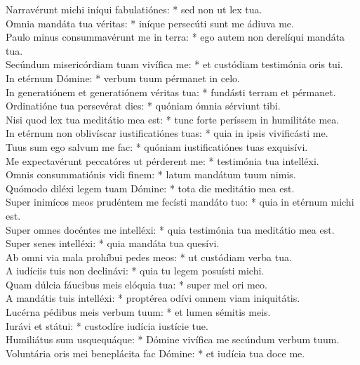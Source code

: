 {	Narravérunt michi iníqui fabulatiónes: * sed non ut lex tua. \\
	Omnia mandáta tua véritas: * iníque persecúti sunt me ádiuva me. \\
	Paulo minus consummavérunt me in terra: * ego autem non derelíqui mandáta tua. \\
	Secúndum misericórdiam tuam vivífica me: * et custódiam testimónia oris tui. \\
	In etérnum Dómine: * verbum tuum pérmanet in celo. \\
	In generatiónem et generatiónem véritas tua: * fundásti terram et pérmanet. \\
	Ordinatióne tua persevérat dies: * quóniam ómnia sérviunt tibi. \\
	Nisi quod lex tua meditátio mea est: * tunc forte períssem in humilitáte mea. \\
	In etérnum non oblivíscar iustificatiónes tuas: * quia in ipsis vivificásti me. \\
	Tuus sum ego salvum me fac: * quóniam iustificatiónes tuas exquisívi. \\
	Me expectavérunt peccatóres ut pérderent me: * testimónia tua intelléxi. \\
	Omnis consummatiónis vidi finem: * latum mandátum tuum nimis. \\
	Quómodo diléxi legem tuam Dómine: * tota die meditátio mea est. \\
	Super inimícos meos prudéntem me fecísti mandáto tuo: * quia in etérnum michi est. \\
	Super omnes docéntes me intelléxi: * quia testimónia tua meditátio mea est. \\
	Super senes intelléxi: * quia mandáta tua quesívi. \\
	Ab omni via mala prohíbui pedes meos: * ut custódiam verba tua. \\
	A iudíciis tuis non declinávi: * quia tu legem posuísti michi. \\
	Quam dúlcia fáucibus meis elóquia tua: * super mel ori meo. \\
	A mandátis tuis intelléxi: * proptérea odívi omnem viam iniquitátis. \\
	Lucérna pédibus meis verbum tuum: * et lumen sémitis meis. \\
	Iurávi et státui: * custodíre iudícia iustície tue. \\
	Humiliátus sum usquequáque: * Dómine vivífica me secúndum verbum tuum. \\
	Voluntária oris mei beneplácita fac Dómine: * et iudícia tua doce me. \\
}
